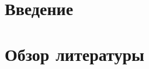 \documentclass[12pt]{book}
\begin{document}
\tableofcontents

\chapter{Введение}


\chapter{Обзор литературы}



%



\end{document}
